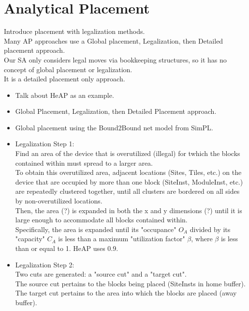 \documentclass[twocolumn]{article}
\begin{document}
\section{Analytical Placement}
    Introduce placement with legalization methods. \\
    Many AP approaches use a Global placement, Legalization, then Detailed placement approach. \\
    Our SA only considers legal moves via bookkeeping structures, so it has no concept of global placement or legalization. \\
    It is a detailed placement only approach. \\
    \begin{itemize}
        \item Talk about HeAP as an example.
        \item Global Placement, Legalization, then Detailed Placement approach.
        \item Global placement using the Bound2Bound net model from SimPL.
        \item Legalization Step 1: \\
            Find an area of the device that is overutilized (illegal) for twhich the blocks contained within must spread to a larger area. \\
            To obtain this overutilized area, adjacent locations (Sites, Tiles, etc.) on the device that are occupied by more than one block (SiteInst, ModuleInst, etc.) are repeatedly clustered together, until all clusters are bordered on all sides by non-overutilized locations. \\ 
            Then, the area (?) is expanded in both the x and y dimensions (?) until it is large enough to accommodate all blocks contained within. \\
            Specifically, the area is expanded until its "occupance" \(O_A\) divided by its "capacity" \(C_A\) is less than a maximum "utilization factor" $\beta$, where $\beta$ is less than or equal to 1. HeAP uses 0.9.
        \item Legalization Step 2: \\
            Two cuts are generated: a "source cut" and a "target cut". \\
            The source cut pertains to the blocks being placed (SiteInsts in home buffer). \\ 
            The target cut pertains to the area into which the blocks are placed (away buffer). \\

\end{itemize}
\end{document}

